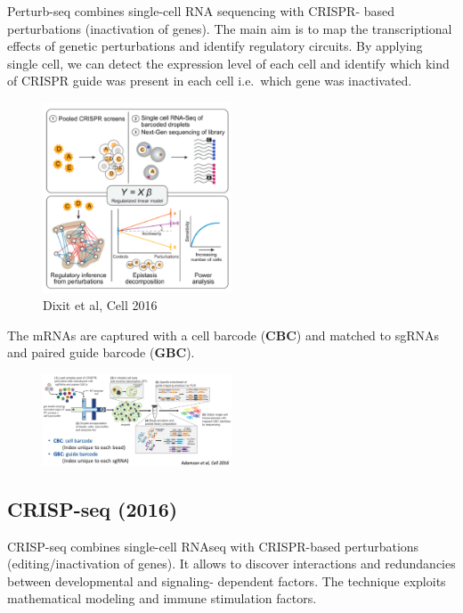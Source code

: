 Perturb-seq combines single-cell RNA sequencing with CRISPR- based
perturbations (inactivation of genes). The main aim is to map the
transcriptional effects of genetic perturbations and identify regulatory
circuits. By applying single cell, we can detect the expression level of
each cell and identify which kind of CRISPR guide was present in each
cell i.e.~which gene was inactivated.

\begin{figure}
\centering
\includegraphics[width=0.5\textwidth]{images/Screen_Shot_2023-02-22_at_20-40-56.png}
\caption{Dixit et al, Cell 2016}
\end{figure}


The mRNAs are captured with a cell barcode (\textbf{CBC}) and matched to
sgRNAs and paired guide barcode (\textbf{GBC}).

\begin{figure}
\centering
\includegraphics[width=0.5\textwidth]{images/Screenshot_12.png}
\caption{}
\end{figure}

\hypertarget{crisp-seq-2016}{%
\subsection{CRISP-seq (2016)}\label{crisp-seq-2016}}

CRISP-seq combines single-cell RNAseq with CRISPR-based perturbations
(editing/inactivation of genes). It allows to discover interactions and
redundancies between developmental and signaling- dependent factors. The
technique exploits mathematical modeling and immune stimulation factors.

